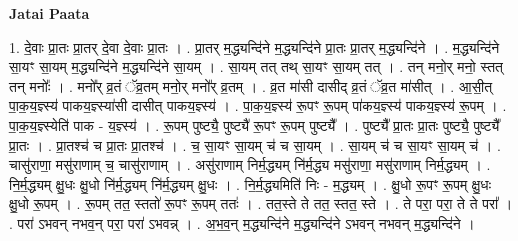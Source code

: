 \documentclass[17pt]{extarticle}
\begin{document}
\textbf{Jatai Paata} \newline

1. दे॒वाः प्रा॒तः प्रा॒तर् दे॒वा दे॒वाः प्रा॒तः । . प्रा॒तर् म॒द्ध्यन्दि॑ने म॒द्ध्यन्दि॑ने प्रा॒तः प्रा॒तर् म॒द्ध्यन्दि॑ने । . म॒द्ध्यन्दि॑ने सा॒यꣳ सा॒यम् म॒द्ध्यन्दि॑ने म॒द्ध्यन्दि॑ने सा॒यम् । . सा॒यम् तत् तथ् सा॒यꣳ सा॒यम् तत् । . तन् मनो॒र् मनो॒ स्तत् तन् मनोः᳚ । . मनो᳚र् व्र॒तं ॅव्र॒तम् मनो॒र् मनो᳚र् व्र॒तम् । . व्र॒त मा॑सी दासीद् व्र॒तं ॅव्र॒त मा॑सीत् । . आ॒सी॒त् पा॒क॒य॒ज्ञ्स्य॑ पाकय॒ज्ञ्स्या॑सी दासीत् पाकय॒ज्ञ्स्य॑ । . पा॒क॒य॒ज्ञ्स्य॑ रू॒पꣳ रू॒पम् पा॑कय॒ज्ञ्स्य॑ पाकय॒ज्ञ्स्य॑ रू॒पम् । . पा॒क॒य॒ज्ञ्स्येति॑ पाक - य॒ज्ञ्स्य॑ । . रू॒पम् पुष्ट्यै॒ पुष्ट्यै॑ रू॒पꣳ रू॒पम् पुष्ट्यै᳚ । . पुष्ट्यै᳚ प्रा॒तः प्रा॒तः पुष्ट्यै॒ पुष्ट्यै᳚ प्रा॒तः । . प्रा॒तश्च॑ च प्रा॒तः प्रा॒तश्च॑ । . च॒ सा॒यꣳ सा॒यम् च॑ च सा॒यम् । . सा॒यम् च॑ च सा॒यꣳ सा॒यम् च॑ । . चासु॑राणा॒ मसु॑राणाम् च॒ चासु॑राणाम् । . असु॑राणाम् निर्म॒द्ध्यम् नि॑र्म॒द्ध्य मसु॑राणा॒ मसु॑राणाम् निर्म॒द्ध्यम् । . नि॒र्म॒द्ध्यम् क्षु॒धः क्षु॒धो नि॑र्म॒द्ध्यम् नि॑र्म॒द्ध्यम् क्षु॒धः । . नि॒र्म॒द्ध्यमिति॑ निः - म॒द्ध्यम् । . क्षु॒धो रू॒पꣳ रू॒पम् क्षु॒धः क्षु॒धो रू॒पम् । . रू॒पम् तत॒ स्ततो॑ रू॒पꣳ रू॒पम् ततः॑ । . तत॒स्ते ते तत॒ स्तत॒ स्ते । . ते परा॒ परा॒ ते ते परा᳚ । . परा॑ ऽभवन् नभव॒न् परा॒ परा॑ ऽभवन्न् । . अ॒भ॒व॒न् म॒द्ध्यन्दि॑ने म॒द्ध्यन्दि॑ने ऽभवन् नभवन् म॒द्ध्यन्दि॑ने । \newline
\end{document}
